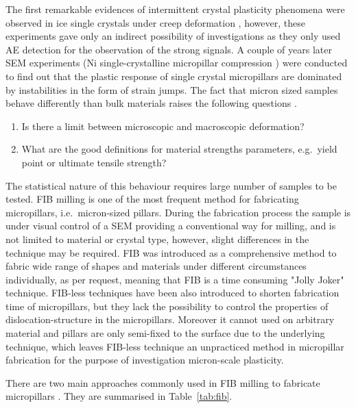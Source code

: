 The first remarkable evidences of intermittent crystal plasticity phenomena were observed in ice single crystals under creep deformation \cite{miguel2001intermittent,weiss2000statistical}, however, these experiments gave only an indirect possibility of investigations as they only used AE detection for the observation of the strong signals. A couple of years later SEM experiments (Ni single-crystalline micropillar compression \cite{Uchic986,Dimiduk1188,doi:10.1146/annurev-matsci-082908-145422}) were conducted to find out that the plastic response of single crystal micropillars are dominated by instabilities in the form of strain jumps. The fact that micron sized samples behave differently than bulk materials raises the following questions \cite{ARZT19985611,GREER2011654,ISPANOVITY20136234}.
\begin{enumerate}
\item Is there a limit between microscopic and macroscopic deformation?
\item What are the good definitions for material strengths parameters, e.g.\ yield point or ultimate tensile strength?
\end{enumerate}

The statistical nature of this behaviour requires large number of samples to be tested. FIB milling \cite{0960-1317-11-4-301} is one of the most frequent method for fabricating micropillars, i.e.\ micron-sized pillars. During the fabrication process the sample is under visual control of a SEM providing a conventional way for milling, and is not limited to material or crystal type, however, slight differences in the technique may be required. FIB was introduced as a comprehensive method to fabric wide range of shapes and materials under different circumstances individually, as per request, meaning that FIB is a time consuming "Jolly Joker" technique. FIB-less techniques have been also introduced \cite{doi:10.1021/nl902872w,PhysRevLett.104.135503} to shorten fabrication time of micropillars, but they lack the possibility to control the properties of dislocation-structure in the micropillars. Moreover it cannot used on arbitrary material and pillars are only semi-fixed to the surface due to the underlying technique, which leaves FIB-less technique an unpracticed method in micropillar fabrication for the purpose of investigation micron-scale plasticity.

There are two main approaches commonly used in FIB milling to fabricate micropillars \cite{HUTSCH201449}. They are summarised in Table~\ref{tab:fib}.

